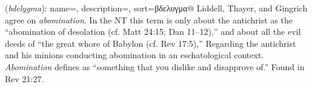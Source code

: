 \item[Abomination,]

(\textit{bdelygma}):
{
    name=,
    description={},
    sort=βδελυγμα@
}
Liddell, Thayer, and Gingrich agree on \emph{abomination}. In the NT this term is only about the antichrist as the ``abomination of desolation (cf. Matt 24:15; Dan 11--12),'' and about all the evil deeds of ``the great whore of Babylon (cf. Rev 17:5),'' Regarding the antichrist and his minions conducting abomination in an eschatological context. \emph{Abomination} defines as ``something that you dislike and disapprove of.''
Found in Rev 21:27.
